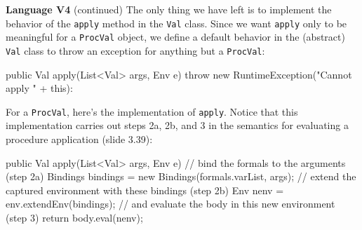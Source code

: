 \begin{minipage}[t]{\sw}
\slidenumber
\LARGE
{\bf Language V4} (continued)\exx
The only thing we have left is to implement
the behavior of the \verb'apply' method in the \verb'Val' class.
Since we want \verb'apply' only to be meaningful for a \verb'ProcVal' object,
we define a default behavior in the (abstract) \verb'Val' class
to throw an exception for anything but a \verb'ProcVal':
\Large
\begin{qv}
public Val apply(List<Val> args, Env e) {
    throw new RuntimeException("Cannot apply " + this): 
}
\end{qv}
\LARGE
For a \verb'ProcVal', here's the implementation of \verb'apply'.
Notice that this implementation carries out steps 2a, 2b, and 3
in the semantics for evaluating a procedure application
(slide 3.39):
\Large
\begin{qv}
public Val apply(List<Val> args, Env e) {
    // bind the formals to the arguments (step 2a)
    Bindings bindings = new Bindings(formals.varList, args);
    // extend the captured environment with these bindings (step 2b)
    Env nenv = env.extendEnv(bindings);
    // and evaluate the body in this new environment (step 3)
    return body.eval(nenv);
}
\end{qv}
\end{minipage}
